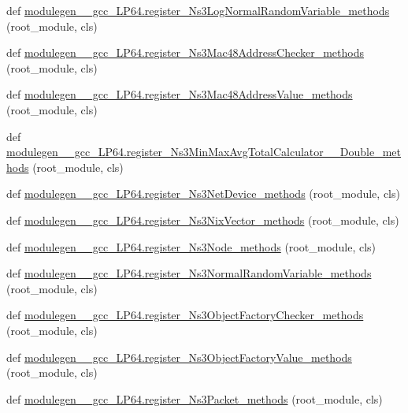 \begin{DoxyCompactItemize}
\item 
def \hyperlink{namespacemodulegen____gcc__LP64_ae7aba903a40a328adf29c1a4e3b4c374}{modulegen\+\_\+\+\_\+gcc\+\_\+\+L\+P64.\+register\+\_\+\+Ns3\+Log\+Normal\+Random\+Variable\+\_\+methods} (root\+\_\+module, cls)
\item 
def \hyperlink{namespacemodulegen____gcc__LP64_a8b5d96f51d4bdc5d94489bcc0a50e648}{modulegen\+\_\+\+\_\+gcc\+\_\+\+L\+P64.\+register\+\_\+\+Ns3\+Mac48\+Address\+Checker\+\_\+methods} (root\+\_\+module, cls)
\item 
def \hyperlink{namespacemodulegen____gcc__LP64_aa62ae7526abc00b083df3d90589e2e92}{modulegen\+\_\+\+\_\+gcc\+\_\+\+L\+P64.\+register\+\_\+\+Ns3\+Mac48\+Address\+Value\+\_\+methods} (root\+\_\+module, cls)
\item 
def \hyperlink{namespacemodulegen____gcc__LP64_ad326c29517c8a45d72ddcb40dcdaf75c}{modulegen\+\_\+\+\_\+gcc\+\_\+\+L\+P64.\+register\+\_\+\+Ns3\+Min\+Max\+Avg\+Total\+Calculator\+\_\+\+\_\+\+Double\+\_\+methods} (root\+\_\+module, cls)
\item 
def \hyperlink{namespacemodulegen____gcc__LP64_a2518a92fbd97a7666c5b4897eeb07c34}{modulegen\+\_\+\+\_\+gcc\+\_\+\+L\+P64.\+register\+\_\+\+Ns3\+Net\+Device\+\_\+methods} (root\+\_\+module, cls)
\item 
def \hyperlink{namespacemodulegen____gcc__LP64_a5cca2624411c350fed578acdd9616437}{modulegen\+\_\+\+\_\+gcc\+\_\+\+L\+P64.\+register\+\_\+\+Ns3\+Nix\+Vector\+\_\+methods} (root\+\_\+module, cls)
\item 
def \hyperlink{namespacemodulegen____gcc__LP64_a158d48a8db192c306a8eff9ae0b0503a}{modulegen\+\_\+\+\_\+gcc\+\_\+\+L\+P64.\+register\+\_\+\+Ns3\+Node\+\_\+methods} (root\+\_\+module, cls)
\item 
def \hyperlink{namespacemodulegen____gcc__LP64_aa148bd7210335689691b38939225327f}{modulegen\+\_\+\+\_\+gcc\+\_\+\+L\+P64.\+register\+\_\+\+Ns3\+Normal\+Random\+Variable\+\_\+methods} (root\+\_\+module, cls)
\item 
def \hyperlink{namespacemodulegen____gcc__LP64_a4f37eb35629332dd2318799b3efe197e}{modulegen\+\_\+\+\_\+gcc\+\_\+\+L\+P64.\+register\+\_\+\+Ns3\+Object\+Factory\+Checker\+\_\+methods} (root\+\_\+module, cls)
\item 
def \hyperlink{namespacemodulegen____gcc__LP64_aa08b54c074e688b2a88a54ada11db8fc}{modulegen\+\_\+\+\_\+gcc\+\_\+\+L\+P64.\+register\+\_\+\+Ns3\+Object\+Factory\+Value\+\_\+methods} (root\+\_\+module, cls)
\item 
def \hyperlink{namespacemodulegen____gcc__LP64_a6784a1ccebf471415830ba331480b02c}{modulegen\+\_\+\+\_\+gcc\+\_\+\+L\+P64.\+register\+\_\+\+Ns3\+Packet\+\_\+methods} (root\+\_\+module, cls)

\end{DoxyCompactItemize}
